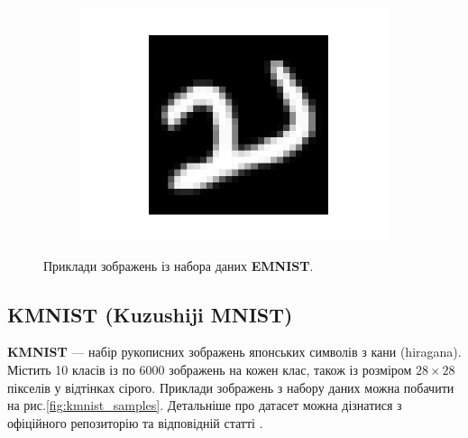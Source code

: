 \documentclass[14pt,a4paper]{extarticle}
\begin{document}
\begin{figure}[htb]
\begin{subfigure}[b]{0.3\textwidth}
    \includegraphics[width=\textwidth]{../res/emnist/sample_8.png}
    \label{fig:emnist_sample_8}
  \end{subfigure}
  
  \caption{Приклади зображень із набора даних \textbf{EMNIST}.}
  \label{fig:emnist_samples}
\end{figure}

\subsection{KMNIST (Kuzushiji MNIST)}
\textbf{KMNIST} --- набір рукописних зображень японських символів з кани (hiragana). Містить 10 класів із по 6000 зображень на кожен клас, також із розміром $28 \times 28$ пікселів у відтінках сірого. Приклади зображень з набору даних можна побачити на рис.\ref{fig:kmnist_samples}. Детальніше про датасет можна дізнатися з офіційного репозиторію \cite{kmnist} та відповідній статті \cite{clanuwat2018deep}.
\end{document}
